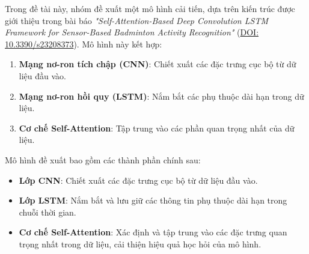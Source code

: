 Trong đề tài này, nhóm đề xuất một mô hình cải tiến, dựa trên kiến trúc được giới thiệu trong bài báo \textit{"Self-Attention-Based Deep Convolution LSTM Framework for Sensor-Based Badminton Activity Recognition"} (\href{https://doi.org/10.3390/s23208373}{DOI: 10.3390/s23208373}). Mô hình này kết hợp:
\begin{enumerate}
    \item \textbf{Mạng nơ-ron tích chập (CNN)}: Chiết xuất các đặc trưng cục bộ từ dữ liệu đầu vào.
    \item \textbf{Mạng nơ-ron hồi quy (LSTM)}: Nắm bắt các phụ thuộc dài hạn trong dữ liệu.
    \item \textbf{Cơ chế Self-Attention}: Tập trung vào các phần quan trọng nhất của dữ liệu.
\end{enumerate}

Mô hình đề xuất bao gồm các thành phần chính sau:
\begin{itemize}
    \item \textbf{Lớp CNN}: Chiết xuất các đặc trưng cục bộ từ dữ liệu đầu vào.
    \item \textbf{Lớp LSTM}: Nắm bắt và lưu giữ các thông tin phụ thuộc dài hạn trong chuỗi thời gian.
    \item \textbf{Cơ chế Self-Attention}: Xác định và tập trung vào các đặc trưng quan trọng nhất trong dữ liệu, cải thiện hiệu quả học hỏi của mô hình.
\end{itemize}

